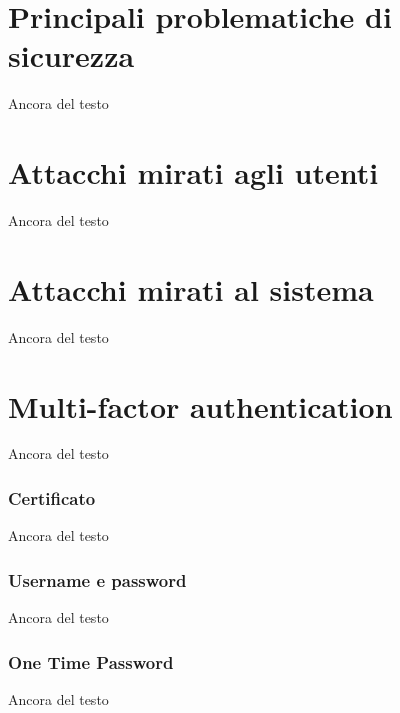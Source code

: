 \section{Principali problematiche di sicurezza}
Ancora del testo

\section{Attacchi mirati agli utenti}
Ancora del testo

\section{Attacchi mirati al sistema}
Ancora del testo

\section{Multi-factor authentication}
Ancora del testo

\subsubsection{Certificato}
Ancora del testo

\subsubsection{Username e password}
Ancora del testo

\subsubsection{One Time Password}
Ancora del testo

